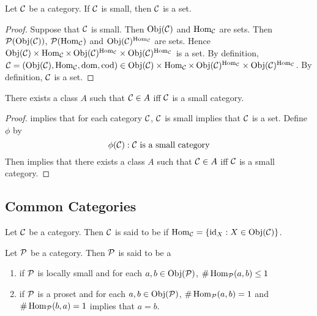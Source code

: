 \documentclass{book}
\begin{document}
	\begin{ex} 
		Let $\MC$ be a category. If $\MC$ is small, then $\MC$ is a set. 
	\end{ex}

	\begin{proof}
		Suppose that $\MC$ is small. Then $\Obj(\MC)$ and $\Hom_{\MC}$ are sets. Then $\MP(\Obj(\MC))$, $\MP(\Hom_{\MC})$ and $\Obj(\MC)^{\Hom_{\MC}}$ are sets. Hence $\Obj(\MC) \times \Hom_{\MC} \times \Obj(\MC)^{\Hom_{\MC}} \times \Obj(\MC)^{\Hom_{\MC}}$ is a set. By definition, $\MC = (\Obj(\MC), \Hom_{\MC}, \dom, \cod) \in \Obj(\MC) \times \Hom_{\MC} \times \Obj(\MC)^{\Hom_{\MC}} \times \Obj(\MC)^{\Hom_{\MC}}$. By definition, $\MC$ is a set. 
	\end{proof}
	
	\begin{ex} 
		There exists a class $A$ such that $\MC \in A$ iff $\MC$ is a small category. 
	\end{ex}

	\begin{proof}
		 implies that for each category $\MC$, $\MC$ is small implies that $\MC$ is a set. Define $\phi$ by $$\phi(\MC): \MC \text{ is a small category} $$ 
		Then  implies that there exists a class $A$ such that $\MC \in A$ iff $\MC$ is a small category.  
	\end{proof}



	
	
	
	
	
	
	
	
	
	
	
	\subsection{Common Categories}

	\begin{defn}  
		Let $\MC$ be a category. Then $\MC$ is said to be  if $\Hom_{\MC} = \{\id_X: X \in \Obj(\MC)\}$. 
	\end{defn}

	\begin{defn}
		Let $\MP$ be a category. Then $\MP$ is said to be a 
		\begin{enumerate}
			\item {} if $\MP$ is locally small and for each $a, b \in \Obj(\MP)$, $\# \Hom_{\MP}(a,b) \leq 1$
			\item {} if $\MP$ is a proset and for each $a,b \in \Obj(\MP)$, $\# \Hom_{\MP}(a,b) = 1$ and $\# \Hom_{\MP}(b,a) = 1$ implies that $a = b$.  
		\end{enumerate}
	\end{defn}
	
\end{document}
